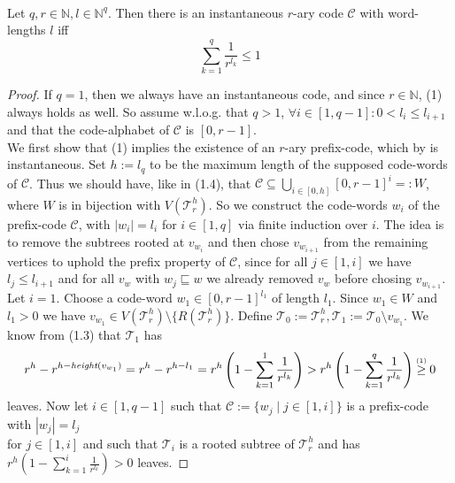 \documentclass[12pt]{article}
\newcommand{\up}[2]{\mathrel{\overset{\makebox[0pt]{\mbox{\normalfont\tiny #2}}}{#1}}}
\newcommand{\T}[0]{{\mathcal{T}_r^h}}
\newcommand{\he}[0]{\textit{height}}
\newenvironment{statement3}[3]{\begin{trivlist}
\item[\hskip \labelsep {\bfseries #1}\hskip \labelsep {\bfseries #2} {#3}\textbf{.}]}{\end{trivlist}}
\begin{document}
\begin{statement3}{(1.6)}{Theorem}{(Kraft's Inequality)}\strut\\[2pt]
    Let $q,r \in \mathbb{N}, l \in \mathbb{N}^q$. Then there is an instantaneous $r$-ary code $\mathcal{C}$
    with word-lengths $l$ iff
    \begin{equation}
        \sum_{k=1}^{q} \frac{1}{r^{l_k}} \leq 1
    \end{equation}

    \begin{proof}
        If $q = 1$, then we always have an instantaneous code, and since $r \in \mathbb{N}$, (1) always holds
        as well.
        So assume w.l.o.g. that $q > 1$, $\forall i \in [1,q-1]: 0 < l_i \leq l_{i+1}$
        and that the code-alphabet of $\mathcal{C}$ is $[0,r-1]$.\\[10pt]
        We first show that (1) implies the existence of an $r$-ary prefix-code, which by
        \cite{ICT} is instantaneous.
        Set $h := l_q$ to be the maximum length of the supposed code-words of $\mathcal{C}$.
        Thus we should have, like in (1.4), that $\mathcal{C} \subseteq \bigcup_{i \in [0,h]} [0,r-1]^i =: W$, where
        $W$ is in bijection with $V(\T)$.
        So we construct the code-words $w_i$ of the prefix-code $\mathcal{C}$, with $|w_i| = l_i$ for $i \in [1,q]$
        via finite induction over $i$. The idea is to remove the subtrees rooted at $v_{w_i}$ and then
        chose $v_{w_{i+1}}$ from the remaining vertices to uphold the prefix property of $\mathcal{C}$,
        since for all $j \in [1,i]$ we have $l_j \leq l_{i+1}$ and for all $v_{w}$ with $w_j \sqsubseteq w$ we already removed $v_w$ before
        chosing $v_{w_{i+1}}$.\\[5pt]
        Let $i = 1$. Choose a code-word $w_1 \in [0,r-1]^{l_1}$ of length $l_1$. Since $w_1 \in W$ and $l_1 > 0$ we have
        $v_{w_1} \in V(\T) \setminus \{R(\T)\}$. Define $\mathcal{T}_0 := \T, \mathcal{T}_1 := \mathcal{T}_0 \setminus v_{w_1}$. We know
        from (1.3) that $\mathcal{T}_1$ has
        $$
            r^h - r^{h - \he(v_{w_1})} = r^h - r^{h - l_1} = r^h\left(1 - \sum_{k=1}^{1} \frac{1}{r^{l_k}}\right)
            > r^h\left(1 - \sum_{k=1}^{q} \frac{1}{r^{l_k}}\right) \up{\geq}{(1)} 0
        $$
        leaves. Now let $i \in [1,q-1]$ such that $\mathcal{C} := \{w_j \mid j \in [1,i]\}$ is a prefix-code
        with $|w_j| = l_j$\\[2pt]
        for $j \in [1,i]$ and such that $\mathcal{T}_i$ is a rooted subtree of $\T$ and has $r^h(1 - \sum_{k=1}^{i}\frac{1}{r^{l_k}}) > 0$ leaves.

\end{proof}
\end{statement3}
\end{document}
